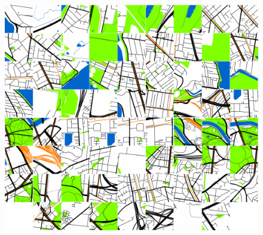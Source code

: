 \documentclass[10pt,letterpaper]{article}
\begin{document}
\begin{figure}[!htbp]
\centering   
\includegraphics[scale=0.14]{Images/PlosOne/Fig10.png}   

\end{figure}
\end{document}
